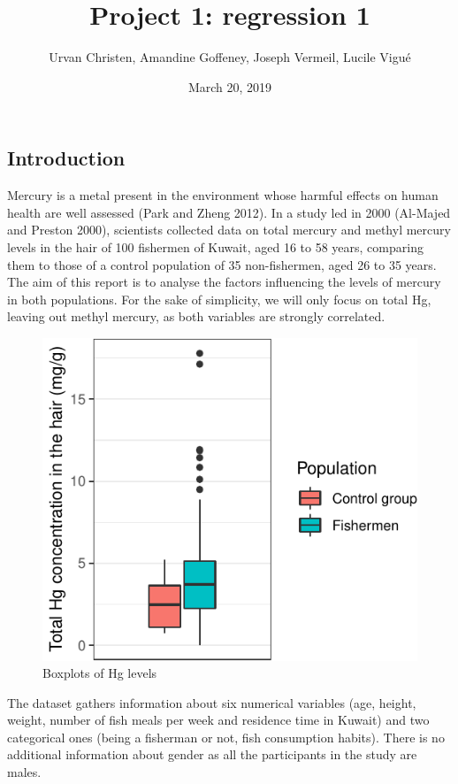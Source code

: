 \documentclass[12pt,]{article}
\title{Project 1: regression 1}
\author{Urvan Christen, Amandine Goffeney, Joseph Vermeil, Lucile Vigué}
\date{March 20, 2019}
\begin{document}
\maketitle

\subsection{Introduction}\label{introduction}

Mercury is a metal present in the environment whose harmful effects on
human health are well assessed (Park and Zheng 2012). In a study led in
2000 (Al-Majed and Preston 2000), scientists collected data on total
mercury and methyl mercury levels in the hair of 100 fishermen of
Kuwait, aged 16 to 58 years, comparing them to those of a control
population of 35 non-fishermen, aged 26 to 35 years. The aim of this
report is to analyse the factors influencing the levels of mercury in
both populations. For the sake of simplicity, we will only focus on
total Hg, leaving out methyl mercury, as both variables are strongly
correlated.

\begin{figure}

\hfill{}\includegraphics{Report_files/figure-latex/unnamed-chunk-4-1} 

\caption{Boxplots of Hg levels}\label{fig:unnamed-chunk-4}
\end{figure}

The dataset gathers information about six numerical variables (age,
height, weight, number of fish meals per week and residence time in
Kuwait) and two categorical ones (being a fisherman or not, fish
consumption habits). There is no additional information about gender as
all the participants in the study are males.
\end{document}

